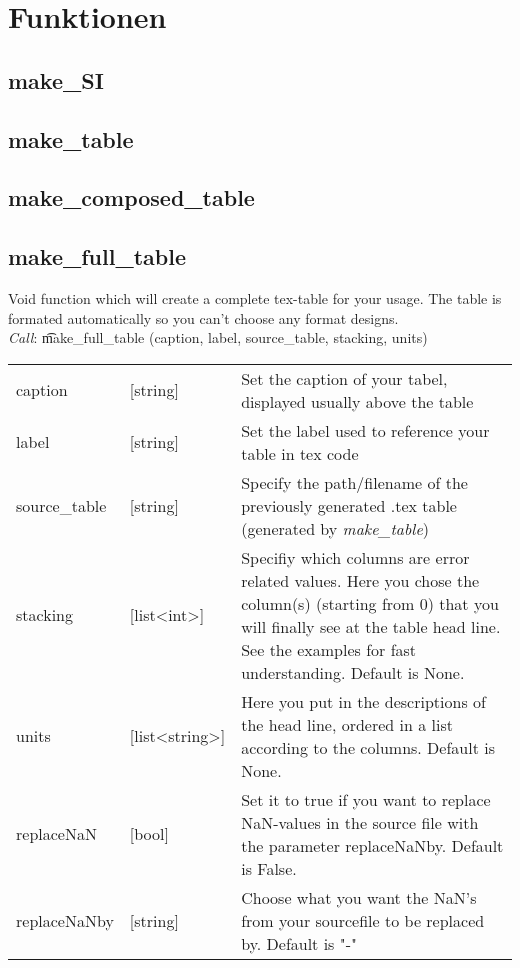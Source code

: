 \section{Funktionen}
\subsection{make\_SI}
\subsection{make\_table}
\subsection{make\_composed\_table}
\subsection{make\_full\_table}
Void function which will create a complete tex-table for your usage. The table is formated automatically so you can't choose any format designs. \\
\emph{Call}: \t make\_full\_table (caption, label, source\_table, stacking, units)
\begin{table}
  \centering
  \begin{tabular}{p{} p{} p{}}
    caption   & [string]  & Set the caption of your tabel, displayed usually above the table\\
    label     & [string]  & Set the label used to reference your table in tex code\\
    source\_table & [string]  & Specify the path/filename of the previously generated .tex table (generated by \emph{make\_table}) \\
    stacking  & [list<int>]  & Specifiy which columns are error related values. Here you chose the column(s) (starting from 0) that you will finally see at the table head line. See the examples for fast understanding. Default is None.\\
    units     & [list<string>] & Here you put in the descriptions of the head line, ordered in a list according to the columns. Default is None.\\
    replaceNaN & [bool] & Set it to true if you want to replace NaN-values in the source file with the parameter replaceNaNby. Default is False. \\
    replaceNaNby & [string] & Choose what you want the NaN's from your sourcefile to be replaced by. Default is "-"\\
  \end{tabular}
\end{table}
